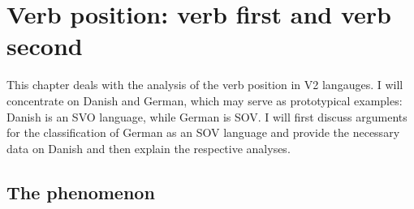 \chapter{Verb position: verb first and verb second}
\label{chap-verb-position}

This chapter deals with the analysis of the verb position in V2 langauges. I will concentrate on
Danish and German, which may serve as prototypical examples: Danish is an SVO language, while German
is SOV. I will first discuss arguments for the classification of German as an SOV language and
provide the necessary data on Danish and then explain the respective analyses.

\section{The phenomenon}

